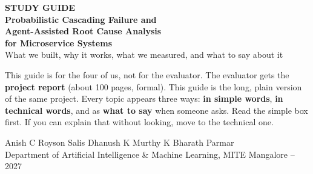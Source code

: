 \documentclass[11pt,a4paper,oneside]{report}
\begin{document}
\begin{titlepage}
\centering
{\Large\bfseries\color{tech} STUDY GUIDE}\\[10pt]
{\Huge\bfseries Probabilistic Cascading Failure and\\Agent-Assisted Root Cause Analysis\\for Microservice Systems}\\[14pt]
{\large What we built, why it works, what we measured, and what to say about it}\\[28pt]
\begin{tcolorbox}[colback=gray!6,colframe=gray!50,width=0.82\textwidth,boxrule=0.5pt]
\raggedright\small
This guide is for the four of us, not for the evaluator. The evaluator gets the \textbf{project report} (about 100 pages, formal). This guide is the long, plain version of the same project. Every topic appears three ways: \textbf{in simple words}, \textbf{in technical words}, and as \textbf{what to say} when someone asks. Read the simple box first. If you can explain that without looking, move to the technical one.
\end{tcolorbox}
\vfill
{\large Anish C \quad Royson Salis \quad Dhanush K Murthy \quad K Bharath Parmar}\\[4pt]
{\small Department of Artificial Intelligence \& Machine Learning, MITE Mangalore --2027}
\end{titlepage}
\tableofcontents



























\end{document}
